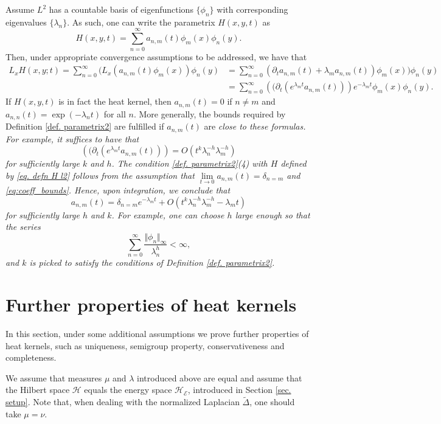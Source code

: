 \documentclass[11pt,reqno]{amsart}
\theoremstyle{remark}
\theoremstyle{definition}
\numberwithin{theorem}{section} \numberwithin{equation}{section}
\newcommand{\Hil}{\mathcal{H}}
\begin{document}
Assume $L^2$ has a countable basis of eigenfunctions $\{\phi_{n}\}$ with corresponding eigenvalues $\{\lambda_{n}\}$.  As such,
one can write the parametrix $H(x,y,t)$ as
\begin{equation}\label{eq. defn H l2}
H(x,y,t) = \sum\limits_{n=0}^{\infty}a_{n,m}(t)\phi_{m}(x)\phi_{n}(y).
\end{equation}
Then, under appropriate convergence assumptions to be addressed, we have that
\begin{align*}
L_{x}H(x,y;t)= \sum\limits_{n=0}^{\infty}(L_{x}(a_{n,m}(t)\phi_{m}(x))\phi_{n}(y)
&= \sum\limits_{n=0}^{\infty}(\partial_{t}a_{n,m}(t)+\lambda_{m}a_{n,m}(t))\phi_{m}(x))\phi_{n}(y)
\\&= \sum\limits_{n=0}^{\infty}\left((\partial_{t}(e^{\lambda_{m}t}a_{n,m}(t))\right)e^{-\lambda_{m}t}\phi_{m}(x)\phi_{n}(y).
\end{align*}
If $H(x,y,t)$ is in fact the heat kernel, then $a_{n,m}(t) = 0$ if $n\neq m$ and $a_{n,n}(t) = \exp(-\lambda_{n}t)$ for all $n$.
More generally, the bounds required by  Definition \ref{def. parametrix2} are fulfilled if
$a_{n,m}(t)$  are \it close \rm to these formulas.  For example, it suffices to have that
\begin{equation}\label{eq:coeff_bounds}
\left((\partial_{t}(e^{\lambda_{m}t}a_{n,m}(t))\right) = O\left(t^{k}\lambda_{n}^{-h}\lambda_{m}^{-h}\right)
\end{equation}
for sufficiently large $k$ and $h$.
The condition \ref{def. parametrix2}(4) with $H$ defined by \eqref{eq. defn H l2}
follows from the assumption that $\lim\limits_{t \rightarrow 0}a_{n,m}(t) = \delta_{n=m}$ and \eqref{eq:coeff_bounds}.  Hence,
upon integration, we conclude that
$$
a_{n,m}(t) = \delta_{n=m}e^{-\lambda_{m}t}+O\left(t^{k}\lambda_{n}^{-h}\lambda_{m}^{-h}-\lambda_{m}t\right)
$$
for sufficiently large $h$ and $k$.  For example, one can choose $h$ large enough so that the series
$$
\sum\limits_{n=0}^{\infty}\frac{\Vert \phi_{n}\Vert_{\infty}}{\lambda_{n}^{h}} < \infty,
$$
and $k$ is picked to satisfy the conditions of Definition \ref{def. parametrix2}.


\section{Further properties of heat kernels}
In this section, under some additional assumptions we prove further properties of heat kernels, such as uniqueness, semigroup property, conservativeness and completeness.

We assume that measures $\mu$ and $\lambda$ introduced above are equal and assume that the Hilbert space $\Hil$ equals the energy space $\Hil_{\mathcal{E}}$, introduced in Section \ref{sec. setup}. Note that, when dealing with the normalized Laplacian $\tilde \Delta$, one should take $\mu=\nu$.
\end{document}
